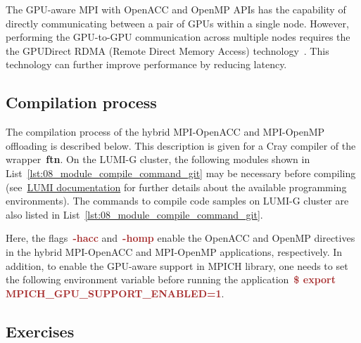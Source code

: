 \par
The GPU-aware MPI with OpenACC and OpenMP APIs has the capability of directly communicating between a pair of GPUs within a single node.
However, performing the GPU-to-GPU communication across multiple nodes requires the the GPUDirect RDMA (Remote Direct Memory Access) technology~\cite{gpudirect-rdma}.
This technology can further improve performance by reducing latency.




\subsection{Compilation process}


\par
The compilation process of the hybrid MPI-OpenACC and MPI-OpenMP offloading is described below.
This description is given for a Cray compiler of the wrapper~\textbf{ftn}.
On the LUMI-G cluster, the following modules shown in List~\ref{lst:08_module_compile_command_git} may be necessary before compiling (see~\href{https://docs.lumi-supercomputer.eu/development/compiling/prgenv/}{LUMI documentation} for further details about the available programming environments).
The commands to compile code samples on LUMI-G cluster are also listed in List~\ref{lst:08_module_compile_command_git}.





\par
Here, the flags~\textbf{\textcolor{brown}{-hacc}} and~\textbf{\textcolor{brown}{-homp}} enable the OpenACC and OpenMP directives in the hybrid MPI-OpenACC and MPI-OpenMP applications, respectively.
In addition, to enable the GPU-aware support in MPICH library, one needs to set the following environment variable before running the application~\textbf{\textcolor{brown}{\$ export MPICH\_GPU\_SUPPORT\_ENABLED=1}}.




\subsection{Exercises}


